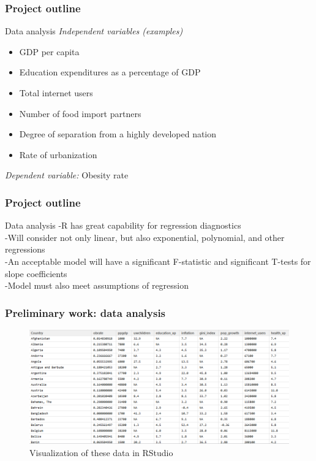 \documentclass{beamer}
\begin{document}
\begin{frame}
\frametitle{Project outline}
\begin{block}
{Data analysis}
{\emph {Independent variables (examples)}}
\begin{itemize}
\item GDP per capita
\item Education expenditures as a percentage of GDP
\item Total internet users
\item Number of food import partners
\item Degree of separation from a highly developed nation
\item Rate of urbanization
\end{itemize}

{\emph {Dependent variable:}} Obesity rate
\end{block}
\end{frame}

\begin{frame}
\frametitle{Project outline}
\begin{block}
{Data analysis}
-R has great capability for regression diagnostics
\\
-Will consider not only linear, but also exponential, polynomial, and other regressions
\\
-An acceptable model will have a significant F-statistic and significant T-tests for slope coefficients
\\
-Model must also meet assumptions of regression
\end{block}
\end{frame}

\begin{frame}
\frametitle{Preliminary work: data analysis}
\begin{figure}
\label{fig:dataframe}
\caption{Visualization of these data in RStudio}
\centering
\includegraphics{dataframe_R.PNG}
\end{figure}
\end{frame}
\end{document}
